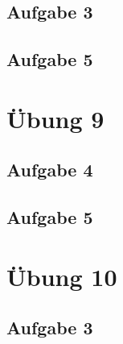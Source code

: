 \documentclass[a4paper,12pt,twoside]{article}
\theoremstyle{definition}
\begin{document}
\subsection{Aufgabe 3}

\subsection{Aufgabe 5}


\newpage
\section{Übung 9}
\subsection{Aufgabe 4}

\subsection{Aufgabe 5}


\newpage
\section{Übung 10}
\subsection{Aufgabe 3}

\end{document}
